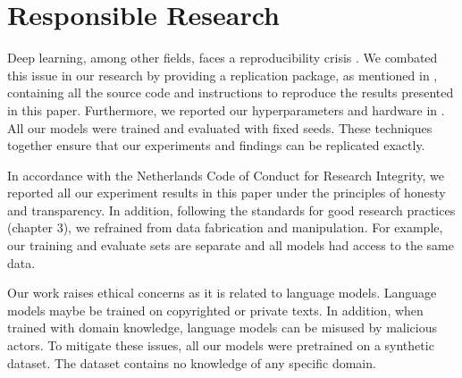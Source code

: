 \section{Responsible Research}
\label{sec:responsible}
Deep learning, among other fields, faces a reproducibility crisis \cite{semmelrock_reproducibility_2023}. We combated this issue in our research by providing a replication package, as mentioned in , containing all the source code and instructions to reproduce the results presented in this paper. Furthermore, we reported our hyperparameters and hardware in . All our models were trained and evaluated with fixed seeds. These techniques together ensure that our experiments and findings can be replicated exactly.

In accordance with the Netherlands Code of Conduct for Research Integrity, we reported all our experiment results in this paper under the principles of honesty and transparency. In addition, following the standards for good research practices (chapter 3), we refrained from data fabrication and manipulation. For example, our training and evaluate sets are separate and all models had access to the same data.

Our work raises ethical concerns as it is related to language models. Language models maybe be trained on copyrighted or private texts. In addition, when trained with domain knowledge, language models can be misused by malicious actors. To mitigate these issues, all our models were pretrained on a synthetic dataset. The dataset contains no knowledge of any specific domain.

